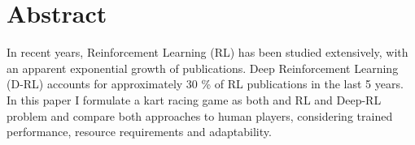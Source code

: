 
\chapter*{Abstract}
In recent years, Reinforcement Learning (RL) has been studied extensively, with an apparent exponential growth of publications. Deep Reinforcement Learning (D-RL) accounts for approximately 30 \% of RL publications in the last 5 years. In this paper I formulate a kart racing game as both and RL and Deep-RL problem and compare both approaches to human players, considering trained performance, resource requirements and adaptability.